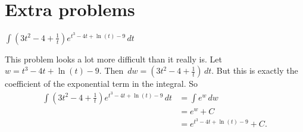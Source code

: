 \documentclass[nooutcomes]{ximera}
\renewcommand{\d}{\,d}
\renewenvironment{freeResponse}{
\ifhandout\setbox0\vbox\bgroup\else
\begin{trivlist}\item[\hskip \labelsep\bfseries Solution:\hspace{2ex}]
\fi}
{\ifhandout\egroup\else
\end{trivlist}
\fi}
\begin{document}
\newpage















	
	
	
	
	
	
	
	
	

	










								
				
				
	











\section{Extra problems}


\begin{problem}
  $\int \left( 3t^2 - 4 + \frac{1}{t} \right) e^{t^3 - 4t + \ln(t) -
    9} \d t$
  \begin{freeResponse}
    This problem looks a lot more difficult than it really is.  Let
    $w=t^3 - 4t + \ln(t) - 9$.  Then
    $\d w = \left( 3t^2 - 4 + \frac{1}{t} \right) \d t$.  But this is
    exactly the coefficient of the exponential term in the integral.
    So
    \begin{align*}
      \int \left( 3t^2 - 4 + \frac{1}{t} \right) e^{t^3 - 4t + \ln(t) - 9} \d t &= \int e^w \d w  \\
                                                                                &= e^w + C  \\
                                                                                &= e^{t^3 - 4t + \ln(t) - 9} + C.
    \end{align*}
  \end{freeResponse}
		
\end{problem}
\end{document}
